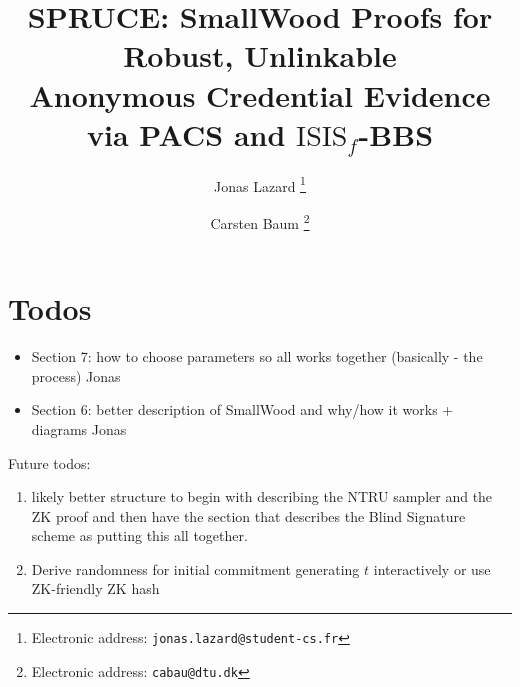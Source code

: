 \documentclass[11pt,a4paper]{article}
\title{SPRUCE: SmallWood Proofs for Robust, Unlinkable \\
 Anonymous Credential Evidence via PACS and $\mathrm{ISIS}_f$-BBS}
\author{Jonas Lazard%
  \thanks{Electronic address: \texttt{jonas.lazard@student-cs.fr}}}
\author{Carsten Baum%
  \thanks{Electronic address: \texttt{cabau@dtu.dk}}}
\affil{DTU Compute, Denmark}
\begin{document}
\maketitle


\section{Todos}
\begin{itemize}
    \item Section 7: how to choose parameters so all works together (basically - the process) {\color{blue} Jonas}
    \item Section 6: better description of SmallWood and why/how it works + diagrams {\color{blue} Jonas}
\end{itemize}

Future todos: 
\begin{enumerate}
    \item likely better structure to begin with describing the NTRU sampler and the ZK proof and then have the section that describes the Blind Signature scheme as putting this all together.
    \item Derive randomness for initial commitment generating $t$ interactively or use ZK-friendly ZK hash
\end{enumerate}




% 
% 


% 




















\nocite{cryptoeprint:2025/356,cryptoeprint:2025/1085,cryptoeprint:2023/1335,GPV08}


\end{document}

